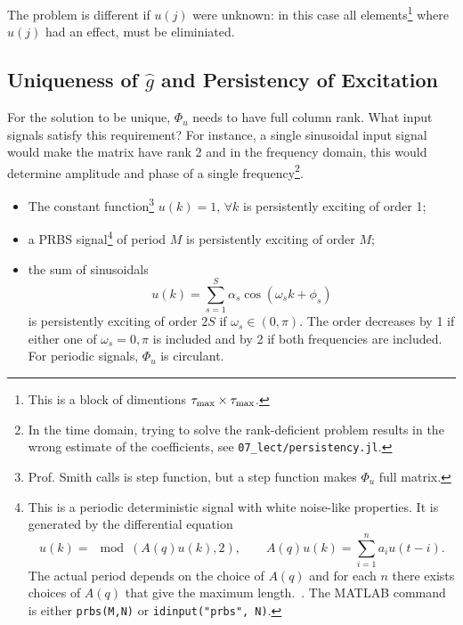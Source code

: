 The problem is different if $u(j)$ were unknown: in this case all elements\footnote{This is a block of dimentions $\tau_\text{max}\times \tau_\text{max}$.} where $u(j)$ had an effect, must be eliminiated.

\subsection{Uniqueness of $\hat{g}$ and Persistency of Excitation}
\label{sec:persistency-excitation}

For the solution to be unique, $\Phi_u$ needs to have full column rank. What input signals satisfy this requirement? For instance, a single sinusoidal input signal would make the matrix have rank 2 and in the frequency domain, this would determine amplitude and phase of a single frequency\footnote{In the time domain, trying to solve the rank-deficient problem results in the wrong estimate of the coefficients, see \texttt{07\_lect/persistency.jl}.}.

\begin{itemize}
\item The constant function\footnote{Prof. Smith calls is step function, but a step function makes $\Phi_u$ full matrix.} $u(k)=1$, $\forall k$ is persistently exciting of order 1;
\item a PRBS signal\footnote{This is a periodic deterministic signal with white noise-like properties. It is generated by the differential equation
    \begin{equation*}
      u(k) = \mod(A(q)u(k),2), \hspace{2em} A(q)u(k) = \sum_{i=1}^na_iu(t-i).
    \end{equation*}
    The actual period depends on the choice of $A(q)$ and for each $n$ there exists choices of $A(q)$ that give the maximum length.~\cite[Chap.~13]{ljung}. The MATLAB command is either \texttt{prbs(M,N)} or \texttt{idinput("prbs", N)}.} of period $M$ is persistently exciting of order $M$;
\item the sum of sinusoidals
  \begin{equation*}
    u(k) = \sum_{s=1}^S \alpha_s \cos(\omega_sk + \phi_s)
  \end{equation*}
  is persistently exciting of order $2S$ if $\omega_s\in (0,\pi)$. The order decreases by 1 if either one of $\omega_s = 0,\pi$ is included and by 2 if both frequencies are included. For periodic signals, $\Phi_u$ is circulant.
\end{itemize}

